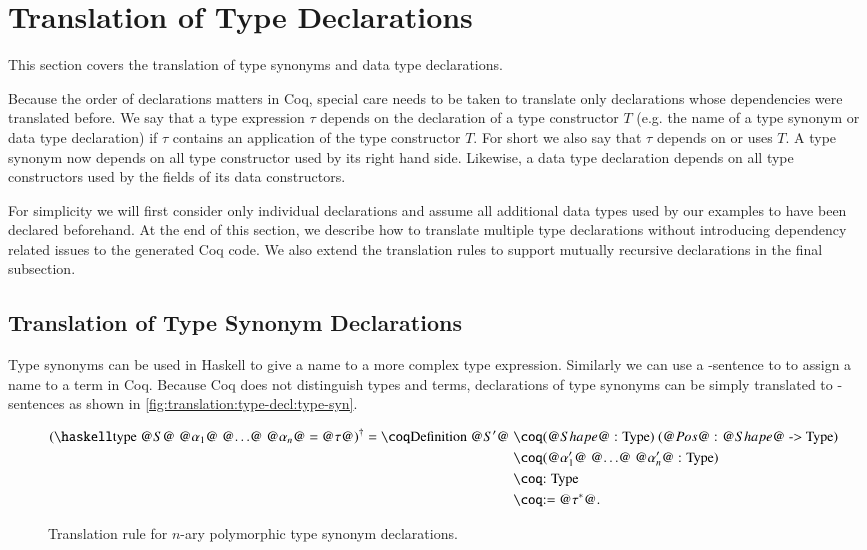 \section{Translation of Type Declarations} \label{sec:translation:type-decl}
This section covers the translation of type synonyms and data type declarations.

Because the order of declarations matters in Coq, special care needs to be taken to translate only declarations whose dependencies were translated before.
We say that a type expression $\tau$ depends on the declaration of a type constructor $T$ (e.g. the name of a type synonym or data type declaration) if $\tau$ contains an application of the type constructor $T$.
For short we also say that $\tau$ depends on or uses $T$.
A type synonym now depends on all type constructor used by its right hand side.
Likewise, a data type declaration depends on all type constructors used by the fields of its data constructors.

For simplicity we will first consider only individual declarations and assume all additional data types used by our examples to have been declared beforehand.
At the end of this section, we describe how to translate multiple type declarations without introducing dependency related issues to the generated Coq code.
We also extend the translation rules to support mutually recursive declarations in the final subsection.

\subsection{Translation of Type Synonym Declarations}
Type synonyms can be used in Haskell to give a name to a more complex type expression.
Similarly we can use a -sentence to to assign a name to a term in Coq.
Because Coq does not distinguish types and terms, declarations of type synonyms can be simply translated to -sentences as shown in \autoref{fig:translation:type-decl:type-syn}.

\begin{figure}[H]
  \begin{align*}
    \toCoq{(
      \haskellM{type @$S$@ @$\alpha_1$@ @$\ldots$@ @$\alpha_n$@ = @$\tau$@}
     )}
    = \coqM{Definition @$S'$@} &\;\coqM{(@$\Shape$@ : Type) (@$\Pos$@ : @$\Shape$@ -> Type)           } \\
                               &\;\coqM{(@$\alpha_1'$@ @$\ldots$@ @$\alpha_n'$@ : Type)} \\
                               &\;\coqM{: Type                                         } \\
                               &\;\coqM{:= @$\toCoqTX{\tau}$@.                             }
  \end{align*}
  \caption{Translation rule for $n$-ary polymorphic type synonym declarations.}
  \label{fig:translation:type-decl:type-syn}
\end{figure}

